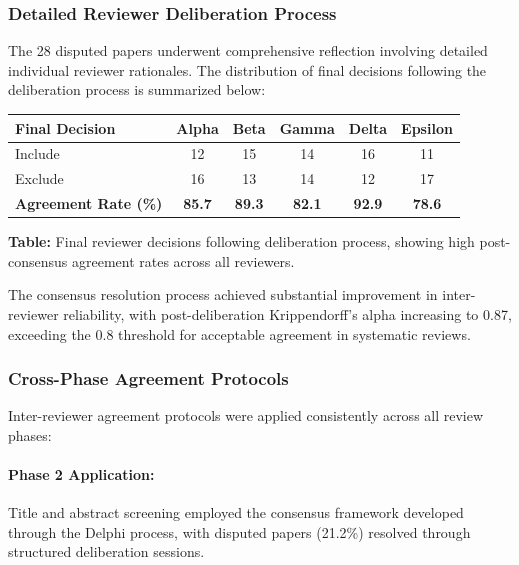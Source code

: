 \documentclass[acmsmall]{acmart}
\begin{document}
\subsubsection{Detailed Reviewer Deliberation Process}\label{subsubsec:inter-reviewer-agreement-deliberation-process}

The 28 disputed papers underwent comprehensive reflection involving detailed individual reviewer rationales. The distribution of final decisions following the deliberation process is summarized below:

\begingroup
\setlength{\tabcolsep}{8pt}
\renewcommand{\arraystretch}{1.3}
\begin{center}
\begin{tabular}{lccccc}
    \toprule
    \textbf{Final Decision} & \textbf{Alpha} & \textbf{Beta} & \textbf{Gamma} & \textbf{Delta} & \textbf{Epsilon} \\
    \midrule
    Include & 12 & 15 & 14 & 16 & 11 \\
    Exclude & 16 & 13 & 14 & 12 & 17 \\
    \midrule
    \textbf{Agreement Rate (\%)} & \textbf{85.7} & \textbf{89.3} & \textbf{82.1} & \textbf{92.9} & \textbf{78.6} \\
    \bottomrule
\end{tabular}
\end{center}
\endgroup

\textbf{Table:} Final reviewer decisions following deliberation process, showing high post-consensus agreement rates across all reviewers.

The consensus resolution process achieved substantial improvement in inter-reviewer reliability, with post-deliberation Krippendorff's alpha increasing to 0.87, exceeding the 0.8 threshold for acceptable agreement in systematic reviews.

\subsubsection{Cross-Phase Agreement Protocols}\label{subsubsec:inter-reviewer-agreement-cross-phase}

Inter-reviewer agreement protocols were applied consistently across all review phases:

\paragraph{Phase 2 Application:} Title and abstract screening employed the consensus framework developed through the Delphi process, with disputed papers (21.2\%) resolved through structured deliberation sessions.
\end{document}
